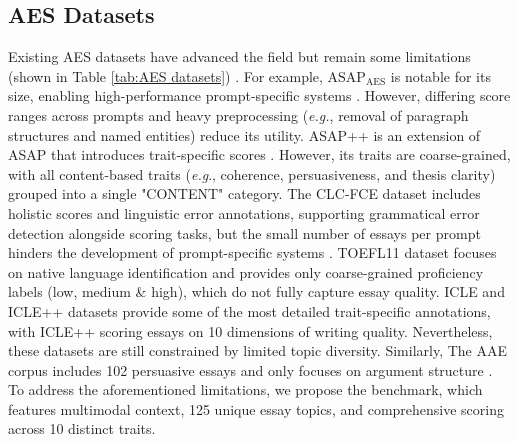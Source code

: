 \subsection{AES Datasets}
Existing AES datasets have advanced the field but remain some limitations (shown in Table \ref{tab:AES datasets}) \cite{Ke2019survey,li2024recent,li2024reflection}. For example, $\text{ASAP}_{\text{AES}}$ is notable for its size, enabling high-performance prompt-specific systems \cite{cozma2018ASAP}. However, differing score ranges across prompts and heavy preprocessing (\textit{e.g.}, removal of paragraph structures and named entities) reduce its utility. ASAP++ is an extension of ASAP that introduces trait-specific scores \cite{mathias2018asap++,li2024reflection}. However, its traits are coarse-grained, with all content-based traits (\textit{e.g}., coherence, persuasiveness, and thesis clarity) grouped into a single "CONTENT" category. The CLC-FCE dataset includes holistic scores and linguistic error annotations, supporting grammatical error detection alongside scoring tasks, but the small number of essays per prompt hinders the development of prompt-specific systems \cite{yannakoudakis2011CLCFCE,li2024recent}. TOEFL11 dataset focuses on native language identification and provides only coarse-grained proficiency labels (low, medium \& high), which do not fully capture essay quality. ICLE \cite{granger2009icle} and ICLE++ \cite{li2024icle++} datasets provide some of the most detailed trait-specific annotations, with ICLE++ scoring essays on 10 dimensions of writing quality. Nevertheless, these datasets are still constrained by limited topic diversity. Similarly, The AAE corpus includes 102 persuasive essays and only focuses on argument structure \cite{stab2014AAE}. To address the aforementioned limitations, we propose the \dataset benchmark, which features multimodal context, 125 unique essay topics, and comprehensive scoring across 10 distinct traits.



